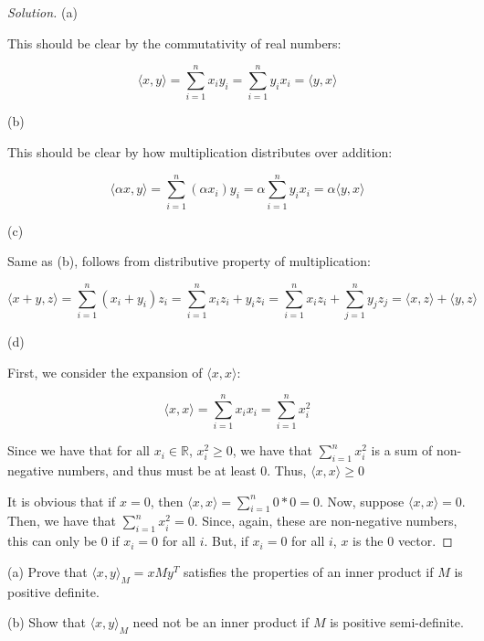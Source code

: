 \documentclass[10pt]{article}
\newenvironment{problem}[2][]{\begin{trivlist}
\item[\hskip \labelsep {\bfseries #1}\hskip \labelsep {\bfseries #2.}]}{\end{trivlist}}
\begin{document}
\begin{proof}[Solution]

(a) 

This should be clear by the commutativity of real numbers:

$$ \langle x, y \rangle = \sum_{i=1}^n x_i y_i = \sum_{i=1}^n y_i x_i = \langle y, x \rangle$$

(b)

This should be clear by how multiplication distributes over addition:

$$ \langle \alpha x, y \rangle = \sum_{i=1}^n (\alpha x_i) y_i = \alpha \sum_{i=1}^n y_i x_i = \alpha \langle y, x \rangle$$

(c) 

Same as (b), follows from distributive property of multiplication:

$$ \langle x+y, z \rangle = \sum_{i=1}^n (x_i + y_i) z_i = \sum_{i=1}^n x_i z_i + y_i z_i = \sum_{i=1}^n x_i z_i + \sum_{j=1}^n y_j z_j  = \langle x, z \rangle + \langle y, z \rangle$$

(d) 

First, we consider the expansion of $\langle x ,x \rangle$:

$$\langle x ,x \rangle = \sum_{i=1}^n x_i x_i = \sum_{i=1}^n x_i^2$$

Since we have that for all $x_i \in \mathbb{R}$, $x_i^2 \geq 0$, we have that $ \sum_{i=1}^n x_i^2$ is a sum of non-negative numbers, and thus must be at least 0. Thus, $\langle x ,x \rangle \geq 0$

It is obvious that if $x = 0$, then $\langle x, x \rangle = \sum_{i=1}^n 0 * 0  =0$. Now, suppose $\langle x, x \rangle = 0$. Then, we have that $ \sum_{i=1}^n x_i^2 = 0$. Since, again, these are non-negative numbers, this can only be 0 if $x_i = 0$ for all $i$. But, if $x_i  = 0$ for all $i$, $x$ is the $0$ vector.


\end{proof}

\begin{problem}{Question 3}

(a) Prove that $\langle x,y\rangle_M = x M y^T$ satisfies the properties of an inner product if $M$ is positive definite.

(b) Show that $\langle x,y\rangle_M$ need not be an inner product if $M$ is positive semi-definite.

\end{problem}
\end{document}
